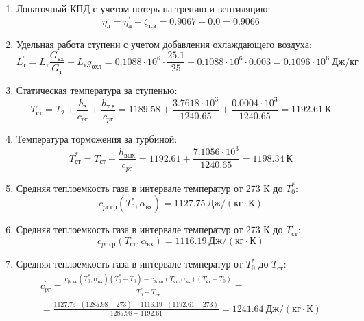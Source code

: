 \documentclass[a4paper,10pt]{article}
\begin{document}
\begin{enumerate}
        \item Лопаточный КПД с учетом потерь на трению и вентиляцию:
        \[
            \eta_л = \eta_л^\prime - \zeta_{т.в} =
                0.9067 - 0.0 =
            0.9066
        \]

        

        \item Удельная работа ступени с учетом добавления охлаждающего воздуха:
        \[
            L_т^\prime = L_т \frac{ G_{вх} }{ G_т }  - L_т g_{охл} =
                0.1088 \cdot 10^6 \cdot
                \frac{ 25.1 }{ 25 }  -
                0.1088 \cdot 10^6 \cdot 0.003 =
            0.1096 \cdot 10^6 \ Дж/кг
        \]

        \item Статическая температура за ступенью:
        \[
            T_{ст} = T_2 + \frac{ h_з }{ c_{pг} } + \frac{ h_{т.в} }{ c_{pг} } =
                1189.58 +
                \frac{3.7618 \cdot 10^3 }{ 1240.65 } +
                \frac{ 0.0004 \cdot 10^3 }{ 1240.65 } =
            1192.61 \ К
        \]

        \item Температура торможения за турбиной:
        \[
            T_{ст}^* = T_{ст} + \frac{ h_{вых} }{ c_{pг} } =
                1192.61 +
                \frac{ 7.1056 \cdot 10^3 }{ 1240.65 } =
            1198.34 \ К
        \]

        \item Средняя теплоемкость газа в интервале температур от 273 К до $T_0^*$:
        \[
            c_{pг\ ср} (T_0^*, \alpha_{вх}) =
            1127.75 \ Дж/(кг \cdot К)
        \]

        \item Средняя теплоемкость газа в интервале температур от 273 К до $T_{ст}$:
        \[
            c_{pг\ ср} (T_{ст}, \alpha_{вх}) =
            1116.19 \ Дж/(кг \cdot К)
        \]

        \item Средняя теплоемкость газа в интервале температур от $T_0^*$ до $T_{ст}$:
        \begin{gather*}
            c_{pг}^\prime = \frac{
		        c_{pг\ ср} (T_0^*, \alpha_{вх}) (T_0^* - T_0) - c_{pг\ ср} (T_{ст}, \alpha_{вх})(T_{ст} - T_0)
		    }{
		        T_0^* - T_{ст}} =\\
            =\frac{
		        1127.75 \cdot
                (1285.98 - 273) -
		        1116.19 \cdot
                (1192.61 - 273)
		    }{
		        1285.98 - 1192.61} =
		    1241.64 \ Дж / (кг \cdot К)\\
        \end{gather*}


\end{enumerate}
\end{document}
